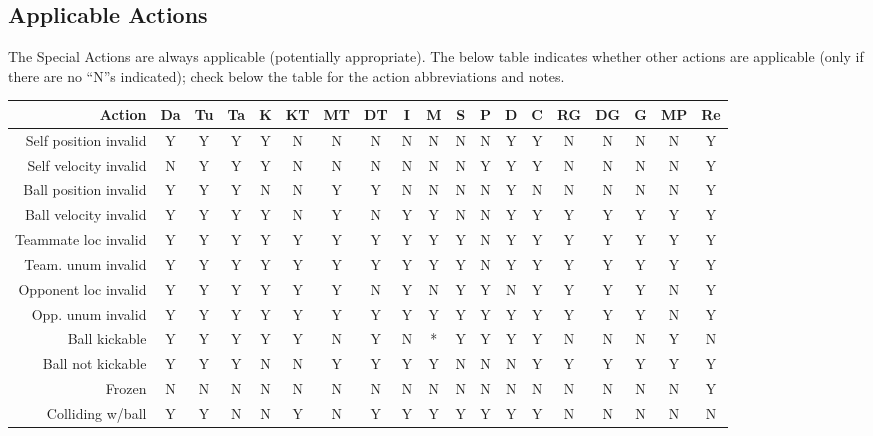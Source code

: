 \documentclass[12pt]{article}
\begin{document}
\subsection{Applicable Actions}
The Special Actions are always applicable (potentially appropriate). The below table indicates whether
other actions are applicable (only if there are no ``N''s indicated); check
below the table for the action abbreviations and notes.

\begin{center}
{\footnotesize
\begin{tabular}{r       | c    c    c    c | c    c    c    c | c   c   c   c   c   c    c    c   c    c}
Action                  & Da & Tu & Ta & K & KT & MT & DT & I & M & S & P & D & C & RG & DG & G & MP & Re \\
\hline \hline
Self position invalid   & Y  & Y  & Y  & Y & N  & N  & N  & N & N & N & N & Y & Y & N  & N  & N & N  & Y \\
Self velocity invalid   & N  & Y  & Y  & Y & N  & N  & N  & N & N & N & Y & Y & Y & N  & N  & N & N  & Y \\
Ball position invalid   & Y  & Y  & Y  & N & N  & Y  & Y  & N & N & N & N & Y & N & N  & N  & N & N  & Y \\
Ball velocity invalid   & Y  & Y  & Y  & Y & N  & Y  & N  & Y & Y & N & N & Y & Y & Y  & Y  & Y & Y  & Y \\
Teammate loc invalid    & Y  & Y  & Y  & Y & Y  & Y  & Y  & Y & Y & Y & N & Y & Y & Y  & Y  & Y & Y  & Y \\
Team. unum invalid      & Y  & Y  & Y  & Y & Y  & Y  & Y  & Y & Y & Y & N & Y & Y & Y  & Y  & Y & Y  & Y \\
Opponent loc invalid    & Y  & Y  & Y  & Y & Y  & Y  & N  & Y & N & Y & Y & N & Y & Y  & Y  & Y & N  & Y \\
Opp. unum invalid       & Y  & Y  & Y  & Y & Y  & Y  & Y  & Y & Y & Y & Y & Y & Y & Y  & Y  & Y & N  & Y \\
\hline
Ball kickable           & Y  & Y  & Y  & Y & Y  & N  & Y  & N & * & Y & Y & Y & Y & N  & N  & N & Y  & N \\
Ball not kickable       & Y  & Y  & Y  & N & N  & Y  & Y  & Y & Y & N & N & N & Y & Y  & Y  & Y & Y  & Y \\
\hline
Frozen                  & N  & N  & N  & N & N  & N  & N  & N & N & N & N & N & N & N  & N  & N & N  & Y \\
Colliding w/ball        & Y  & Y  & N  & N & Y  & N  & Y  & Y & Y & Y & Y & Y & Y & N  & N  & N & N  & N \\

\end{tabular}}
\end{center}
\end{document}
